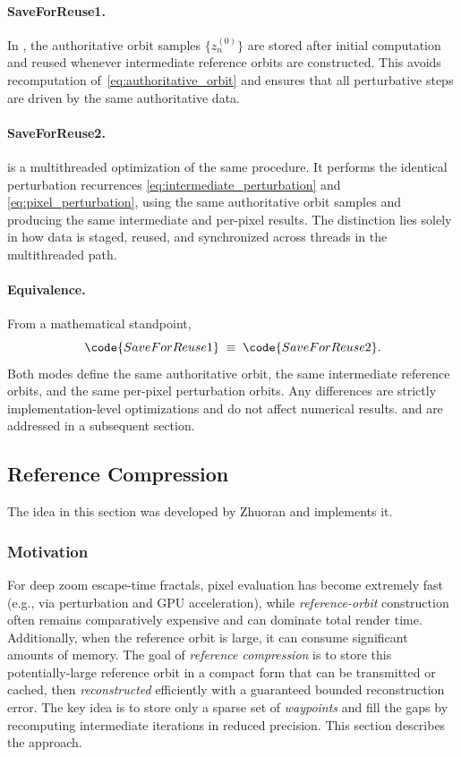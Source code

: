 \paragraph{SaveForReuse1.}
In , the authoritative orbit samples $\{z^{(0)}_n\}$ are stored after initial computation and reused
whenever intermediate reference orbits are constructed.
This avoids recomputation of~\eqref{eq:authoritative_orbit} and ensures that all perturbative steps are driven by the same
authoritative data.

\paragraph{SaveForReuse2.}
 is a multithreaded optimization of the same procedure.
It performs the identical perturbation recurrences
\eqref{eq:intermediate_perturbation} and \eqref{eq:pixel_perturbation}, using the same authoritative orbit samples and
producing the same intermediate and per-pixel results.
The distinction lies solely in how data is staged, reused, and synchronized across threads in the multithreaded path.

\paragraph{Equivalence.}
From a mathematical standpoint,
\[
\code{SaveForReuse1} \;\equiv\; \code{SaveForReuse2}.
\]
Both modes define the same authoritative orbit, the same intermediate reference
orbits, and the same per-pixel perturbation orbits.
Any differences are strictly implementation-level optimizations and do not affect numerical results.
 and  are addressed in a subsequent section.

\subsection{Reference Compression}
\label{sec:ref-compression-zhuoran}

The idea in this section was developed by Zhuoran
\cite{Zhuoran2023ReferenceCompression} and \FractalShark{} implements it.

\subsubsection{Motivation}
For deep zoom escape-time fractals, pixel evaluation has become extremely fast
(e.g., via perturbation and GPU acceleration), while \emph{reference-orbit}
construction often remains comparatively expensive and can dominate total render
time.  Additionally, when the reference orbit is large, it can consume
significant amounts of memory.  The goal of \emph{reference compression} is to
store this potentially-large reference orbit in a compact form that can be
transmitted or cached, then \emph{reconstructed} efficiently with a guaranteed
bounded reconstruction error. The key idea is to store only a sparse set of
\emph{waypoints} and fill the gaps by recomputing intermediate iterations in
reduced precision.  This section describes the approach.

